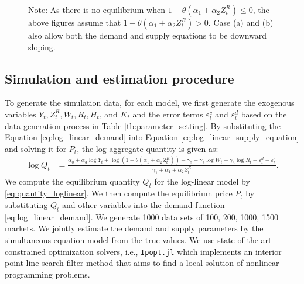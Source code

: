 \documentclass[11pt, a4paper]{article}
\begin{document}
\begin{figure}[!ht]
    \footnotesize
    Note: As there is no equilibrium when $1- \theta(\alpha_1 + \alpha_2 Z^{R}_{t}) \le 0$, the above figures assume that $1- \theta(\alpha_1 + \alpha_2 Z^{R}_{t}) > 0$. 
    Case (a) and (b) also allow both the demand and supply equations to be downward sloping.
\end{figure}







\newpage


\subsection{Simulation and estimation procedure}\label{sec:setting}
To generate the simulation data, for each model, we first generate the exogenous variables $Y_t, Z^{R}_{t}, W_t, R_{t}, H_t$, and $K_t$ and the error terms $\varepsilon_{t}^c$ and $\varepsilon_{t}^d$ based on the data generation process in Table \ref{tb:parameter_setting}.
By substituting the Equation \eqref{eq:log_linear_demand} into Equation \eqref{eq:log_linear_supply_equation} and solving it for $P_{t}$, the log aggregate quantity is given as: 
\begin{align}
    \log Q_t &= \frac{ \alpha_0 + \alpha_3 \log Y_t + \log (1 - \theta (\alpha_1 + \alpha_2 Z^{R}_{t})) - \gamma_0  -  \gamma_2 \log W_{t} - \gamma_3 \log R_t + \varepsilon^{d}_{t} - \varepsilon^{c}_{t}}{\gamma_1+ \alpha_1 + \alpha_2 Z^{R}_{t} }.\label{eq:quantity_loglinear}
\end{align}
We compute the equilibrium quantity $Q_{t}$ for the log-linear model by \eqref{eq:quantity_loglinear}.
We then compute the equilibrium price $P_t$ by substituting $Q_{t}$ and other variables into the demand function \eqref{eq:log_linear_demand}.
We generate 1000 data sets of 100, 200, 1000, 1500 markets.
We jointly estimate the demand and supply parameters by the simultaneous equation model \citep{wooldridge2010econometric} from the true values.
We use state-of-the-art constrained optimization solvers, i.e., \texttt{Ipopt.jl} which implements an interior point line search filter method that aims to find a local solution of nonlinear programming problems.
\end{document}
